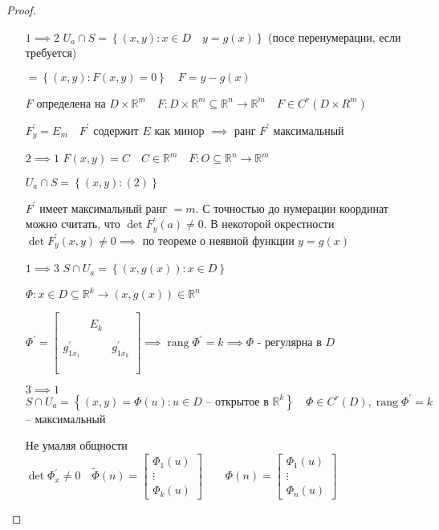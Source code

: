 \documentclass{book}
\newcommand\R{\ensuremath{\mathbb{R}}}
\newcommand{\p}[1]{#1^{\prime}}
\newcommand{\tl}[1]{\widetilde{#1}}
\theoremstyle{definition}
\DeclareMathOperator{\rang}{rang}
\begin{document}
\begin{proof}
    \begin{itemize}
        \item []
        \item [$1\implies 2$] $U_a\cap S = \left\{ (x,y): x\in D\quad y = g(x) \right\} $ (посе перенумерации, если требуется)

            $=\left\{ (x,y): F(x,y) = 0 \right\} \quad F = y-g(x)$

            $F$ определена на  $D\times \R^m\quad F: D\times \R^m \subseteq \R^n \to \R^m\quad F\in C^r\left( D\times R^m \right) $

            $\p F_y = E_m\quad \p F $ содержит  $E$ как минор  $\implies $ ранг $\p F$ максимальный

        \item [$2\implies 1$] $F(x,y) = C\quad C\in \R^m\quad F: O\subseteq \R^n \to  \R^m$

            $U_a\cap S = \left\{ (x,y): (2) \right\} $ 

            $\p F$ имеет максимальный ранг  $=m$. С точностью до нумерации координат можно считать, что  $\det \p F_y(a) \neq  0 $. В некоторой окрестности  $\det \p F_y(x,y) \neq 0 \implies $ по теореме о неявной функции $y = g(x)$
        \item [$1\implies 3$] $S\cap U_a = \left\{ (x,g(x)):x\in D \right\} $

            $\Phi: x\in D \subseteq \R^k\to  (x,g(x))\in \R^n$

            $\p \Phi = \begin{bmatrix} &&\\&E_k&\\&&\\ \p g_{1x_1} & &\p g_{1x_k}\\ &&\\ &&\\ \end{bmatrix} \implies \rang \p \Phi = k \implies \Phi$ - регулярна в $D$
        \item [$3\implies 1$] $ S\cap U_a = \left\{ (x,y) = \Phi(u):u\in D \text{ -- открытое в } \R^k \right\} \quad \Phi\in C^r(D), \rang \p\Phi=k$ -- максимальный 

            Не умаляя общности $\det \p \Phi_x\neq 0\quad \tl \Phi(n) = \begin{bmatrix} \Phi_1(u)\\ \vdots\\ \Phi_k(u) \end{bmatrix} \qquad \Phi(n) = \begin{bmatrix} \Phi_1(u)\\ \vdots\\ \Phi_n(u) \end{bmatrix}$


\end{itemize}
\end{proof}
\end{document}
